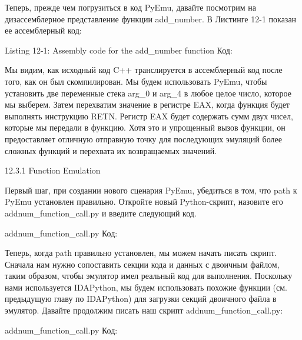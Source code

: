 \documentclass[12pt]{book}
\begin{document}
Теперь, прежде чем погрузиться в код PyEmu, давайте посмотрим на дизассемблерное представление функции add\_number. В Листинге 12-1 показан ее ассемблерный код:

Listing 12-1: Assembly code for the add\_number function
Код:

Мы видим, как исходный код C++ транслируется в ассемблерный код после того, как он был скомпилирован. Мы будем использовать PyEmu, чтобы установить две переменные стека arg\_0 и arg\_4 в любое целое число, которое мы выберем. Затем перехватим значение в регистре EAX, когда функция будет выполнять инструкцию RETN. Регистр EAX будет содержать сумм двух чисел, которые мы передали в функцию. Хотя это и упрощенный вызов функции, он предоставляет отличную отправную точку для последующих эмуляций более сложных функций и перехвата их возвращаемых значений.

12.3.1 Function Emulation

Первый шаг, при создании нового сценария PyEmu, убедиться в том, что path к PyEmu установлен правильно. Откройте новый Python-скрипт, назовите его addnum\_function\_call.py и введите следующий код.

addnum\_function\_call.py
Код:

Теперь, когда path правильно установлен, мы можем начать писать скрипт. Сначала нам нужно сопоставить секции кода и данных с двоичным файлом, таким образом, чтобы эмулятор имел реальный код для выполнения. Поскольку нами используется IDAPython, мы будем использовать похожие функции (см. предыдущую главу по IDAPython) для загрузки секций двоичного файла в эмулятор. Давайте продолжим писать наш скрипт addnum\_function\_call.py:

addnum\_function\_call.py
Код:


\end{document}
